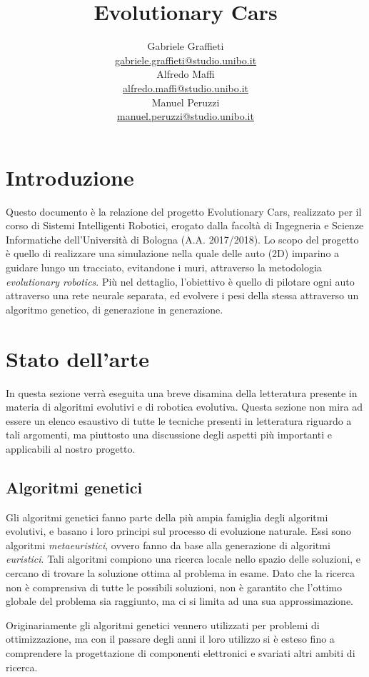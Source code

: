 \documentclass[a4paper,12pt]{article}
\title{\vspace{-5em}\Huge \textbf{Evolutionary Cars}
}
\author{
	Gabriele Graffieti \\ \small \url{gabriele.graffieti@studio.unibo.it}
	\vspace{15pt}
	\\
	Alfredo Maffi \\ \small \url{alfredo.maffi@studio.unibo.it}
	\vspace{15pt}
	\\
	Manuel Peruzzi \\ \small \url{manuel.peruzzi@studio.unibo.it}
}
\date{}
\begin{document}
\maketitle
{}
\tableofcontents
\newpage

\section{Introduzione}

Questo documento è la relazione del progetto Evolutionary Cars, realizzato per il corso di Sistemi Intelligenti Robotici, erogato dalla facoltà di Ingegneria e Scienze Informatiche dell'Università di Bologna (A.A. 2017/2018). Lo scopo del progetto è quello di realizzare una simulazione nella quale delle auto (2D) imparino a guidare lungo un tracciato, evitandone i muri, attraverso la metodologia \emph{evolutionary robotics}. Più nel dettaglio, l'obiettivo è quello di pilotare ogni auto attraverso una rete neurale separata, ed evolvere i pesi della stessa attraverso un algoritmo genetico, di generazione in generazione.

\section{Stato dell'arte} \label{stato-dell-arte}
In questa sezione verrà eseguita una breve disamina della letteratura presente in materia di algoritmi evolutivi e di robotica evolutiva. Questa sezione non mira ad essere un elenco esaustivo di tutte le tecniche presenti in letteratura riguardo a tali argomenti, ma piuttosto una discussione degli aspetti più importanti e applicabili al nostro progetto. 
\subsection{Algoritmi genetici} \label{algoritmi-genetici}
Gli algoritmi genetici fanno parte della più ampia famiglia degli algoritmi evolutivi, e basano i loro principi sul processo di evoluzione naturale. Essi sono algoritmi \emph{metaeuristici}, ovvero fanno da base alla generazione di algoritmi \emph{euristici}. Tali algoritmi compiono una ricerca locale nello spazio delle soluzioni, e cercano di trovare la soluzione ottima al problema in esame. Dato che la ricerca non è comprensiva di tutte le possibili soluzioni, non è garantito che l'ottimo globale del problema sia raggiunto, ma ci si limita ad una sua approssimazione. 

Originariamente gli algoritmi genetici vennero utilizzati per problemi di ottimizzazione, ma con il passare degli anni il loro utilizzo si è esteso fino a comprendere la progettazione di componenti elettronici \cite{antenna} e svariati altri ambiti di ricerca.
\end{document}
